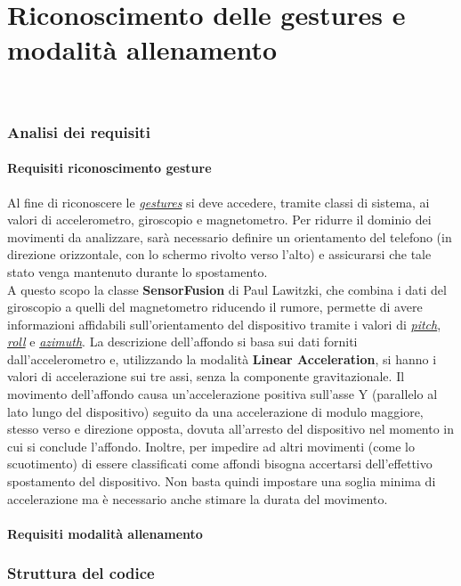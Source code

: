 \documentclass[a4paper,11pt]{article}
\begin{document}
\part{Riconoscimento delle gestures e modalità allenamento}
\ 
\section{Analisi dei requisiti}
\subsection{Requisiti riconoscimento gesture}
Al fine di riconoscere le \hyperref[gesture]{\emph{gestures}} si deve accedere, tramite classi di sistema, ai valori di accelerometro, giroscopio e magnetometro. Per ridurre il dominio dei movimenti da analizzare, sarà necessario definire un orientamento del telefono (in direzione orizzontale, con lo schermo rivolto verso l'alto) e assicurarsi che tale stato venga mantenuto durante lo spostamento.\\ A questo scopo la classe \textbf{SensorFusion} di Paul Lawitzki, che combina i dati del giroscopio a quelli del magnetometro riducendo il rumore, permette di avere informazioni affidabili sull'orientamento del dispositivo tramite i valori di \hyperref[pra]{\emph{pitch}}, \hyperref[pra]{\emph{roll}} e \hyperref[pra]{\emph{azimuth}}. La descrizione dell'affondo si basa sui dati forniti dall'accelerometro e, utilizzando la modalità \textbf{Linear Acceleration}, si hanno i valori di accelerazione sui tre assi, senza la componente gravitazionale. Il movimento dell'affondo causa un'accelerazione positiva sull'asse Y (parallelo al lato lungo del dispositivo) seguito da una accelerazione di modulo maggiore, stesso verso e direzione opposta, dovuta all'arresto del dispositivo nel momento in cui si conclude l'affondo. Inoltre, per impedire ad altri movimenti (come lo scuotimento) di essere classificati come affondi bisogna accertarsi dell'effettivo spostamento del dispositivo. Non basta quindi impostare una soglia minima di accelerazione ma è necessario anche stimare la durata del movimento.
\subsection{Requisiti modalità allenamento}
\newpage

\section{Struttura del codice}
\end{document}
